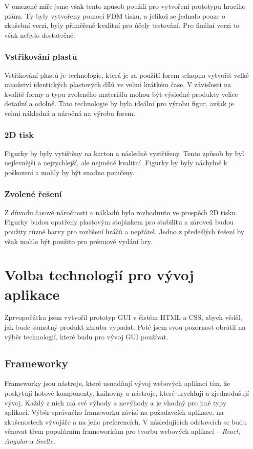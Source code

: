 V omezené míře jsme však tento způsob použili pro vytvoření prototypu hracího plánu. Ty byly vytvořeny pomocí FDM tisku, a jelikož se jednalo pouze o zkušební verzi, byly přiměřeně kvalitní pro účely testování. Pro finální verzi to však nebylo dostatečné.

\subsubsection*{Vstřikování plastů}
Vstřikování plastů je technologie, která je za použití forem schopna vytvořit velké množství identických plastových dílů ve velmi krátkém čase. V závislosti na kvalitě formy a typu zvoleného materiálu mohou být výsledné produkty velice detailní a odolné. Tato technologie by byla ideální pro výrobu figur, avšak je velmi nákladná a náročná na výrobu forem.

\subsubsection*{2D tisk}
Figurky by byly vytištěny na karton a následně vystřiženy. Tento způsob by byl nejlevnější a nejrychlejší, ale nejméně kvalitní. Figurky by byly náchylné k poškození a mohly by být snadno poničeny.

\subsubsection*{Zvolené řešení}
Z důvodu časové náročnosti a nákladů bylo rozhodnuto ve prospěch 2D tisku. Figurky budou opatřeny plastovým stojánkem pro stabilitu a zároveň budou použity různé barvy pro rozlišení hráčů a nepřátel. Jedno z předešlých řešení by však mohlo být použito pro prémiové vydání hry.

\section{Volba technologií pro vývoj aplikace}
Zprvopočátku jsem vytvořil prototyp GUI v čistém HTML a CSS, abych věděl, jak bude samotný produkt zhruba vypadat. Poté jsem svou pozornost obrátil na výběr technologií, které budu pro vývoj GUI používat.

\subsection{Frameworky}
Frameworky jsou nástroje, které usnadňují vývoj webových aplikací tím, že poskytují hotové komponenty, knihovny a nástroje, které urychlují a zjednodušují vývoj. Každý z nich má své výhody a nevýhody a je vhodný pro jiné typy aplikací. Výběr správného frameworku závisí na požadavcích aplikace, na zkušenostech vývojáře a na jeho preferencích. V následujících odstavcích se budu věnovat třem populárním frameworkům pro tvorbu webových aplikací -- \textit{React}, \textit{Angular} a \textit{Svelte}.

